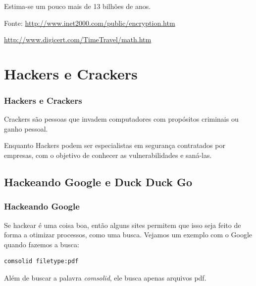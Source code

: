 \begin{frame}[fragile]\frametitle{}


Estima-se um pouco mais de 13 bilhões de anos.

Fonte: \url{http://www.inet2000.com/public/encryption.htm}

\url{http://www.digicert.com/TimeTravel/math.htm}

\end{frame}

\begin{frame}\frametitle{}


\end{frame}

\section{Hackers e Crackers}

\begin{frame}\frametitle{Hackers e Crackers}

Crackers são pessoas que invadem computadores com propósitos criminais
ou ganho pessoal.

Enquanto Hackers podem ser especialistas em segurança contratados por
empresas, com o objetivo de conhecer as vulnerabilidades e saná-las.

\end{frame}

\subsection{Hackeando Google e Duck Duck Go}

\begin{frame}[fragile]\frametitle{Hackeando Google}

Se hackear é uma coisa boa, então alguns sites permitem que isso seja
feito de forma a otimizar processos, como uma busca. Vejamos um exemplo
com o Google quando fazemos a busca:

\begin{verbatim}
comsolid filetype:pdf
\end{verbatim}
Além de buscar a palavra \emph{comsolid}, ele busca apenas arquivos pdf.

\end{frame}

